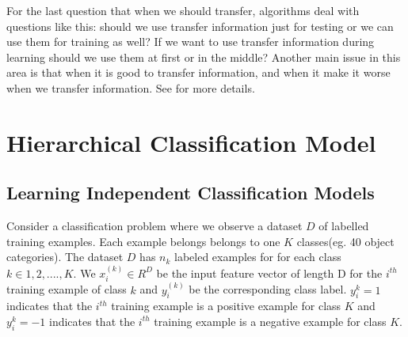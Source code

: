 \documentclass[10pt,twocolumn,letterpaper]{article}
\begin{document}
For the last question that when we should transfer, algorithms deal with questions like this: should we use transfer information just for testing or we can use them for training as well? If we want to use transfer information during learning should we use them at first or in the middle? Another main issue in this area is that when it is good to transfer information, and when it make it worse when we transfer information. See \cite{whentransfer} for more details.



\section{Hierarchical Classification Model}

\subsection{Learning Independent Classification Models}

Consider a classification problem where we observe a dataset $D$ of labelled  training examples. 
Each example belongs belongs to one $K$ classes(eg. 40 object categories). The dataset $D$
has $n_{k}$ labeled examples for for each class $k  \in {1,2,....,K} $. We $x_{i}^{(k)} \in R^{D} $ 
be the input feature vector of length D for the $i^{th}$ training example of class $k$ and 
$y_{i}^{(k)}$ be the corresponding class label. $ y_{i}^{k} = 1 $ indicates that the $i^{th}$ training example 
 is a positive example for class $K$ and  $ y_{i}^{k} = -1 $ indicates that the $i^{th}$ training example 
 is a negative example for class $K$.
 
\end{document}
